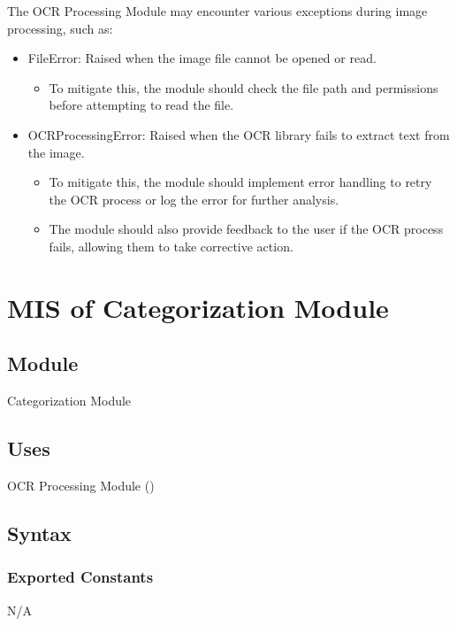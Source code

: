 \documentclass[12pt, titlepage]{article}
\begin{document}
The OCR Processing Module may encounter various exceptions during image processing, such as:

\begin{itemize}
    \item FileError: Raised when the image file cannot be opened or read.
      \begin{itemize}
        \item To mitigate this, the module should check the file path and permissions before attempting to read the file.
      \end{itemize}
    \item OCRProcessingError: Raised when the OCR library fails to extract text from the image.
      \begin{itemize}
        \item To mitigate this, the module should implement error handling to retry the OCR process or log the error for further analysis.
        \item The module should also provide feedback to the user if the OCR process fails, allowing them to take corrective action.
      \end{itemize}
\end{itemize}

\newpage



\section{MIS of Categorization Module}\label{categorization_module}

\subsection{Module}
Categorization Module

\subsection{Uses}
OCR Processing Module ()\\

\subsection{Syntax}

\subsubsection{Exported Constants}
N/A
\end{document}
